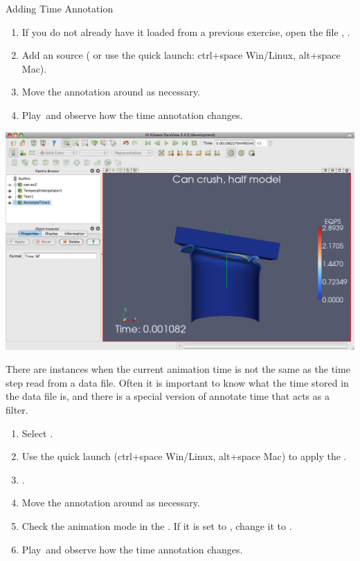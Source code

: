 \begin{exercise}{Adding Time Annotation}
  \label{ex:AddingTimeAnnotation}%
  \begin{enumerate}
  \item If you do not already have it loaded from a previous exercise, open
    the file , \apply.
  \item Add an  source ( \ra {} or use the quick launch: ctrl+space Win/Linux, alt+space Mac).
  \item Move the annotation around as necessary.
  \item Play~\vcrPlay and observe how the time annotation changes.
    \savecounter
  \end{enumerate}

  \begin{inlinefig}
    \includegraphics[width=\scw]{images/AnnotateTimeSource}
  \end{inlinefig}

  There are instances when the current animation time is not the same as
  the time step read from a data file.  Often it is important to know what
  the time stored in the data file is, and there is a special version of
  annotate time that acts as a filter.

  \begin{enumerate}
    \restorecounter
  \item Select .
  \item Use the quick launch (ctrl+space Win/Linux, alt+space Mac) to apply
    the . 
  \item \apply.
  \item Move the annotation around as necessary.
  \item Check the animation mode in the .  If it is set
    to , change it to .
  \item Play~\vcrPlay and observe how the time annotation changes.
  \end{enumerate}


\end{exercise}

